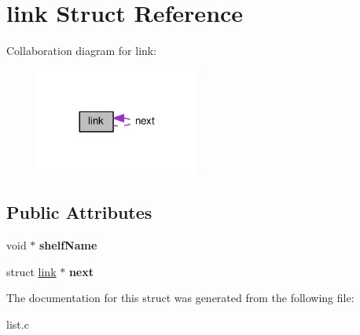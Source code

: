 \hypertarget{structlink}{}\section{link Struct Reference}
\label{structlink}


Collaboration diagram for link\+:
\nopagebreak
\begin{figure}[H]
\begin{center}
\leavevmode
\includegraphics[width=152pt]{structlink__coll__graph}
\end{center}
\end{figure}
\subsection*{Public Attributes}
\begin{DoxyCompactItemize}
\item 
void $\ast$ {\bfseries shelf\+Name}\hypertarget{structlink_a9b099dd6c6a8b1268a687b35f826909d}{}\label{structlink_a9b099dd6c6a8b1268a687b35f826909d}

\item 
struct \hyperlink{structlink}{link} $\ast$ {\bfseries next}\hypertarget{structlink_a7d3b312c211d4e29a3a7df6c5219b923}{}\label{structlink_a7d3b312c211d4e29a3a7df6c5219b923}

\end{DoxyCompactItemize}


The documentation for this struct was generated from the following file\+:\begin{DoxyCompactItemize}
\item 
list.\+c\end{DoxyCompactItemize}

